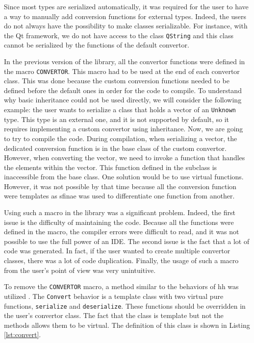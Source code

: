 Since most types are serialized automatically, it was required for the user to
have a way to manually add conversion functions for external types. Indeed, the
users do not always have the possibility to make classes serializable. For
instance, with the Qt framework, we do not have access to the class
\texttt{QString} and this class cannot be serialized by the functions of the
default convertor.

In the previous version of the library, all the convertor functions were defined
in the macro \texttt{CONVERTOR}. This macro had to be used at the end of each
convertor class. This was done because the custom conversion functions needed to
be defined before the default ones in order for the code to compile. To
understand why basic inheritance could not be used directly, we will consider the
following example: the user wants to serialize a class that holds a vector of an
\texttt{Unknown} type. This type is an external one, and it is not supported by
default, so it requires implementing a custom convertor using inheritance. Now,
we are going to try to compile the code. During compilation, when serializing a
vector, the dedicated conversion function is in the base class of the custom
convertor. However, when converting the vector, we need to invoke a function
that handles the elements within the vector. This function defined in the
subclass is inaccessible from the base class. One solution would be to use
virtual functions. However, it was not possible by that time because all the
conversion function were templates as \gls{sfinae} was used to differentiate
one function from another.

Using such a macro in the library was a significant problem. Indeed, the first
issue is the difficulty of maintaining the code. Because all the functions were
defined in the macro, the compiler errors were difficult to read, and it was not
possible to use the full power of an IDE. The second issue is the fact that a
lot of code was generated. In fact, if the user wanted to create multiple
convertor classes, there was a lot of code duplication. Finally, the usage of
such a macro from the user's point of view was very unintuitive.

To remove the \texttt{CONVERTOR} macro, a method similar to the behaviors of
\gls{hh} was utilized \cite{bardakoff2021analysis}. The \texttt{Convert}
behavior is a template class with two virtual pure functions, \texttt{serialize}
and \texttt{deserialize}. These functions should be overridden in the user's
convertor class. The fact that the class is template but not the methods allows
them to be virtual. The definition of this class is shown in Listing
\ref{lst:convert}.


